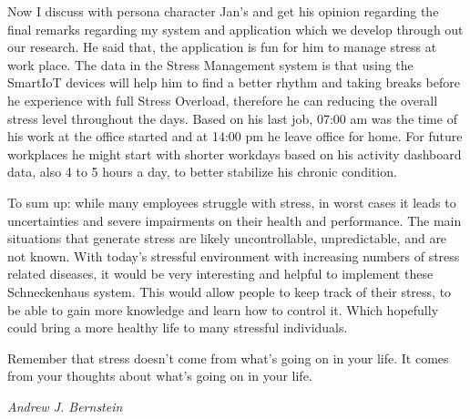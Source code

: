 Now I discuss with persona character Jan's and get his opinion regarding the final remarks regarding my system and application which we develop through out our research. He said that, the application is fun for him to manage stress at work place. The data in the Stress Management system is that using the Smart\acs{IoT} devices will help him to find a better rhythm and taking breaks before he experience with full Stress Overload, therefore he can reducing the overall stress level throughout the days. Based on his last job, 07:00 am was the time of his work at the office started and at 14:00 pm he leave office for home. For future workplaces he might start with shorter workdays based on his activity dashboard data, also 4 to 5 hours a day, to better stabilize his chronic condition.
 
To sum up: while many employees struggle with stress,  in  worst  cases  it  leads  to uncertainties and severe impairments  on their health and performance.  The main situations that  generate  stress  are  likely  uncontrollable,  unpredictable,  and  are  not  known. With today’s stressful environment with increasing numbers of stress related diseases, it would be very interesting and helpful to implement these Schneckenhaus system. This would allow people to keep track of their stress, to be able to gain more knowledge and learn how to control it. Which hopefully could bring a more healthy life to many stressful individuals.

\epigraph{Remember that stress doesn’t come from what’s going on in your life. It comes from your thoughts about what’s going on in your life.}{\textit{Andrew J. Bernstein \\ \citep{Nelson2016ProphetsSeminar}}}



